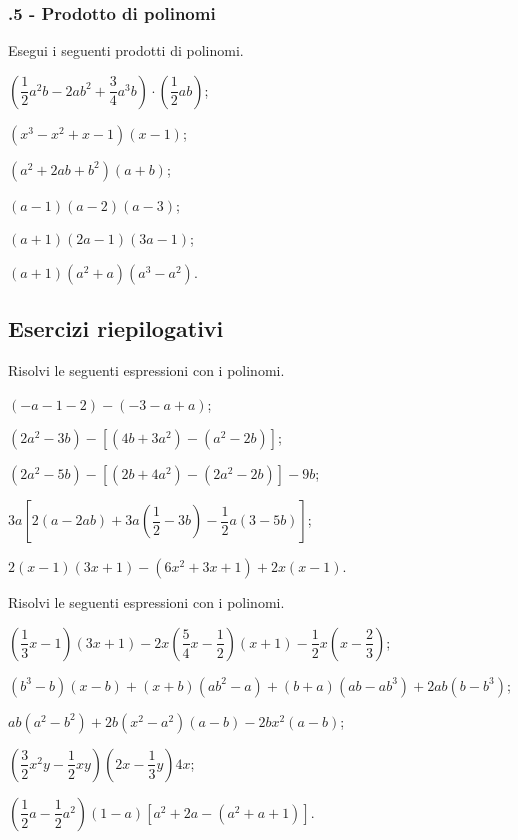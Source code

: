 \subsubsection*{\thechapter.5 - Prodotto di polinomi}
\begin{esercizio}
Esegui i seguenti prodotti di polinomi.
\label{ese:10.20}
\begin{multicols}{2}
\begin{enumeratea}
 \item $\left(\dfrac{1}{2}a^{2}b-2{ab}^{2}+\dfrac{3}{4}a^{3}b\right)\cdot\left(\dfrac{1}{2}{ab}\right)$;
 \item $\left(x^{3}-x^{2}+x-1\right)({x}-1)$;
 \item $\left(a^{2}+2{ab}+b^{2}\right)(a+b)$;
 \item $(a-1)(a-2)(a-3)$;
 \item $(a+1)(2a-1)(3a-1)$;
 \item $(a+1)\left(a^{2}+a\right)\left(a^{3}-a^{2}\right)$.
\end{enumeratea}
\end{multicols}
\end{esercizio}


\subsection{Esercizi riepilogativi}

\begin{esercizio}[\Ast]
Risolvi le seguenti espressioni con i polinomi.
 \begin{enumeratea}
 \item $(-a-1-2)-(-3-a+a)$;
 \item $\left(2a^{2}-3b\right)-\left[\left(4b+3a^{2}\right)-\left(a^{2}-2b\right)\right]$;
 \item $\left(2a^{2}-5b\right)-\left[\left(2b+4a^{2}\right)-\left(2a^{2}-2b\right)\right]-9b$;
 \item $3a\left[2(a-2{ab})+3a\left(\dfrac{1}{2}-3b\right)-\dfrac{1}{2}a(3-5b)\right]$;
 \item $2(x-1)(3x+1)-\left(6x^{2}+3x+1\right)+2x(x-1)$.
 \end{enumeratea}
\end{esercizio}

\begin{esercizio}
Risolvi le seguenti espressioni con i polinomi.
 \begin{enumeratea}
 \item $\left(\dfrac{1}{3}x-1\right)(3x+1)-2x\left(\dfrac{5}{4}x-\dfrac{1}{2}\right)(x+1)-\dfrac{1}{2}x\left(x-\dfrac{2}{3}\right)$;
 \item $\left(b^{3}-b\right)(x-b)+(x+b)\left(ab^{2}-a\right)+(b+a)\left(ab-ab^{3}\right)+2ab\left(b-b^{3}\right)$;
 \item $ab\left(a^{2}-b^{2}\right)+2b\left(x^{2}-a^{2}\right)(a-b)-2bx^{2}(a-b)$;
 \item $\left(\dfrac{3}{2}x^{2}y-\dfrac{1}{2}{xy}\right)\left(2x-\dfrac{1}{3}y\right)4x$;
 \item $\left(\dfrac{1}{2}a-\dfrac{1}{2}a^{2}\right)(1-a)\left[a^{2}+2a-\left(a^{2}+a+1\right)\right]$.
 \end{enumeratea}
\end{esercizio}

